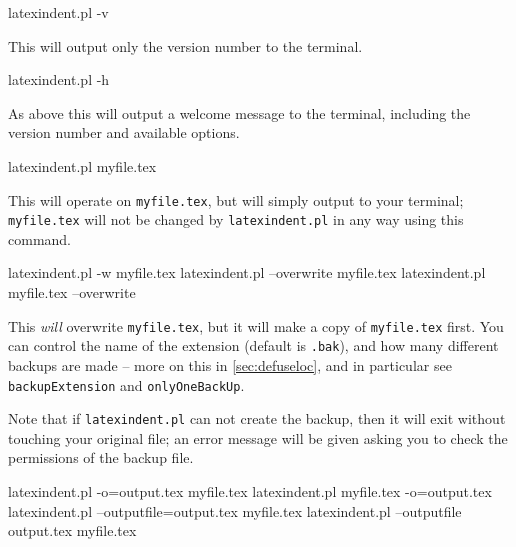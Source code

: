 	\begin{commandshell}
latexindent.pl -v
\end{commandshell}
	This will output only the version number to the terminal.


	\begin{commandshell}
latexindent.pl -h
\end{commandshell}

	As above this will output a welcome message to the terminal, including the version number
	and available options.
	\begin{commandshell}
latexindent.pl myfile.tex
\end{commandshell}

	This will operate on \texttt{myfile.tex}, but will simply output to your terminal;
	\texttt{myfile.tex} will not be changed by \texttt{latexindent.pl} in any way using
	this command.

	\begin{commandshell}
latexindent.pl -w myfile.tex
latexindent.pl --overwrite myfile.tex
latexindent.pl myfile.tex --overwrite 
\end{commandshell}

	This \emph{will} overwrite \texttt{myfile.tex}, but it will make a copy of
	\texttt{myfile.tex} first. You can control the name of the extension (default is
	\texttt{.bak}), and how many different backups are made -- more on this in
	\cref{sec:defuseloc}, and in particular see \texttt{backupExtension} and
	\texttt{onlyOneBackUp}.

	Note that if \texttt{latexindent.pl} can not create the backup, then it will exit without
	touching your original file; an error message will be given asking you to check the
	permissions of the backup file.

	\begin{commandshell} 
latexindent.pl -o=output.tex myfile.tex
latexindent.pl myfile.tex -o=output.tex 
latexindent.pl --outputfile=output.tex myfile.tex
latexindent.pl --outputfile output.tex myfile.tex
\end{commandshell}

